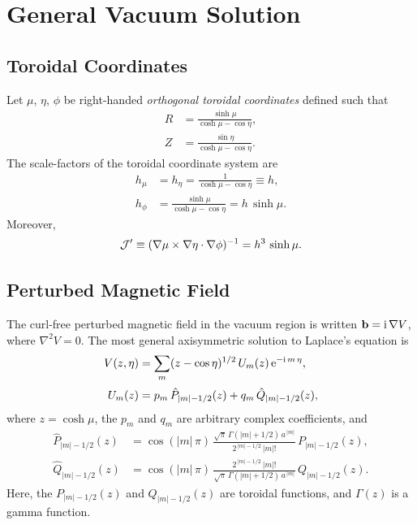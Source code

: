 \documentclass[12pt,prb,aps]{revtex4-1}
\begin{document}
\section{General Vacuum Solution}\label{vacuum}
\subsection{Toroidal Coordinates}
Let $\mu$, $\eta$, $\phi$ be right-handed {\em orthogonal toroidal coordinates}\/ defined such that\,\cite{tj,tj1,mf}
\begin{align}
R &= \frac{\sinh\mu}{\cosh\mu-\cos\eta},\\[0.5ex]
Z&=\frac{\sin\eta}{\cosh\mu-\cos\eta}.
\end{align}
The scale-factors of the toroidal coordinate system are
\begin{align}
h_\mu&=h_\eta= \frac{1}{\cosh\mu-\cos\eta}\equiv h,\\[0.5ex]
h_\phi &= \frac{\sinh\mu}{\cosh\mu-\cos\eta} = h\,\sinh\mu.
\end{align}
Moreover, 
\begin{equation}
{\cal J}' \equiv (\nabla\mu\times\nabla\eta\cdot\nabla\phi)^{-1}= h^3\,\sinh\mu.
\end{equation}

\subsection{Perturbed Magnetic Field}
The curl-free perturbed magnetic field in the vacuum region is written ${\bf b} = {\rm i}\,\nabla V$,
where
$\nabla^2 V =0$.
The most general axisymmetric  solution to Laplace's equation is\,\cite{tj1,mf1}
\begin{align}
V(z,\eta)&= \sum_m (z-\cos\eta)^{1/2}\,U_m(z)\,{\rm e}^{-{\rm i}\,m\,\eta}, \\[0.5ex]
U_m(z) &= p_m\,\hat{P}_{|m|-1/2}(z)+q_m\,\hat{Q}_{|m|-1/2}(z),
\end{align}
where  $z=\cosh\mu$, the $p_m$ and $q_m$ are arbitrary complex coefficients, and 
\begin{align}\label{e21dd}
\hat{P}_{|m|-1/2}(z) &= \cos(|m|\,\pi)\,\frac{\sqrt{\pi}\,\Gamma(|m|+1/2)\,a^{\,|m|}}{2^{\,|m|-1/2}\,|m|!}\,P_{|m|-1/2}(z),\\[0.5ex]
\hat{Q}_{|m|-1/2}(z)&= \cos(|m|\,\pi)\,\frac{2^{\,|m|-1/2}\,|m|!}{\sqrt{\pi}\,\Gamma(|m|+1/2)\,a^{\,|m|}}\,Q_{|m|-1/2}(z).\label{e22dd}
\end{align}
Here,  the $P_{|m|-1/2}(z)$  and $Q_{|m|-1/2}(z)$ are toroidal functions,\cite{as1} and $\Gamma(z)$ is a
gamma function.\cite{as2}
\end{document}
